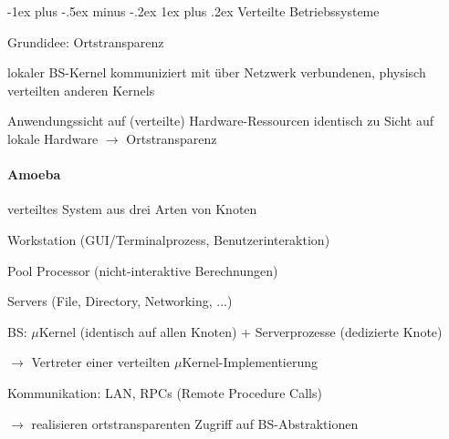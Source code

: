 \documentclass[a4paper]{article}
\makeatletter
\renewcommand{\subsubsection}{\@startsection{subsubsection}{3}{0mm}%
 {-1ex plus -.5ex minus -.2ex}%
 {1ex plus .2ex}%
 {\normalfont\small\bfseries}}
\makeatother
\begin{document}
\begin{multicols}{3}
    \subsubsection{Verteilte Betriebssysteme}
    \begin{itemize*}
        \item Grundidee: Ortstransparenz
        \item lokaler BS-Kernel kommuniziert mit über Netzwerk verbundenen, physisch verteilten anderen Kernels
        \item Anwendungssicht auf (verteilte) Hardware-Ressourcen identisch zu Sicht auf lokale Hardware $\rightarrow$ Ortstransparenz
    \end{itemize*}

    \paragraph{Amoeba}
    \begin{itemize*}
        \item verteiltes System aus drei Arten von Knoten
        \begin{itemize*}
            \item Workstation (GUI/Terminalprozess, Benutzerinteraktion)
            \item Pool Processor (nicht-interaktive Berechnungen)
            \item Servers (File, Directory, Networking, ...)
        \end{itemize*}
        \item BS: $\mu$Kernel (identisch auf allen Knoten) + Serverprozesse (dedizierte Knote)
        \item[$\rightarrow$] Vertreter einer verteilten $\mu$Kernel-Implementierung
        \item Kommunikation: LAN,  RPCs (Remote Procedure Calls)
        \item[$\rightarrow$] realisieren ortstransparenten Zugriff auf BS-Abstraktionen
    \end{itemize*}


\end{multicols}
\end{document}
